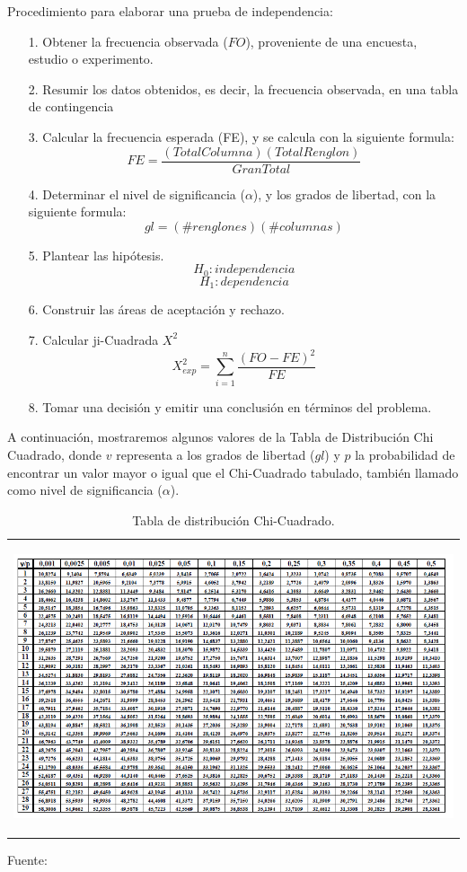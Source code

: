\vskip 0.5cm
Procedimiento para elaborar una prueba de independencia:
\begin{enumerate}
\item[1.] Obtener la frecuencia observada ($FO$), proveniente de una encuesta, estudio o experimento.
\item[2.] Resumir los datos obtenidos, es decir, la frecuencia observada, en una tabla de contingencia
\item[3.] Calcular la frecuencia esperada (FE), y se calcula con la siguiente formula:
\[ FE = \frac{(Total Columna)(Total Renglon)}{Gran Total} \]
\item[4.] Determinar el nivel de significancia ($\alpha$), y los grados de libertad, con la siguiente formula:
\[ gl = (\#renglones)(\#columnas) \]
\item[5.] Plantear las hipótesis.
\[ H_{0}: independencia \]
\[ H_{1}: dependencia \]
\item[6.] Construir las áreas de aceptación y rechazo.
\item[7.] Calcular ji-Cuadrada $X^{2}$
\[ X^{2}_{exp} = \sum_{i=1}^{n} \frac{(FO - FE)^2}{FE} \]
\item[8.] Tomar una decisión y emitir una conclusión en términos del problema.
\end{enumerate}

A continuación, mostraremos algunos valores de la Tabla de Distribución Chi Cuadrado, donde $v$ representa a los grados de libertad ($gl$) y $p$ la probabilidad de encontrar un valor mayor o igual que el Chi-Cuadrado tabulado, también llamado como nivel de significancia ($\alpha$).


\begin{center}
\begin{table}[h!]
\centering
\vskip -0.2cm
\caption{\small{Tabla de distribución Chi-Cuadrado.}}
\label{table:tablaA.1}
\begin{tabular}{c}
\begin{minipage}{.9\textwidth}
\begin{center}
\includegraphics[width=1\textwidth]{Imagenes/Apendice/image001}
\end{center}
\end{minipage}
\end{tabular}
\begin{center}
\vskip 0.2cm
{\small{Fuente: \cite{eyra}}}
\end{center}
\end{table}
\end{center}